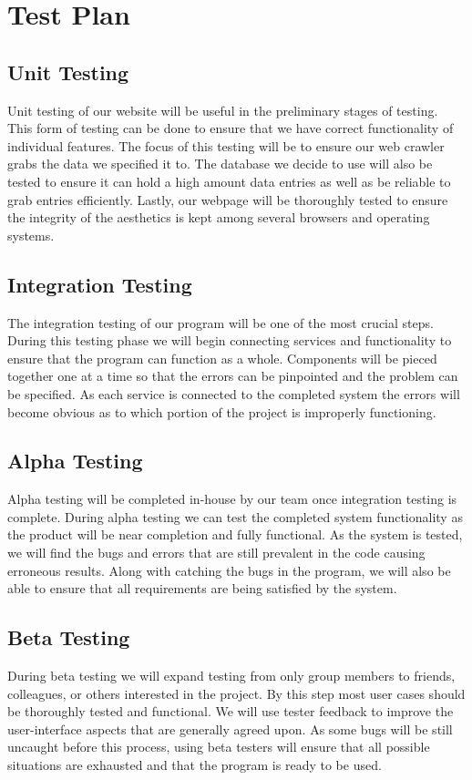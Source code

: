 \chapter{Test Plan}

\section{Unit Testing}
Unit testing of our website will be useful in the preliminary stages of testing. This form of testing can be done to ensure that we have correct functionality of individual features. The focus of this testing will be to ensure our web crawler grabs the data we specified it to. The database we decide to use will also be tested to ensure it can hold a high amount data entries as well as be reliable to grab entries efficiently. Lastly, our webpage will be thoroughly tested to ensure the integrity of the aesthetics is kept among several browsers and operating systems.

\section{Integration Testing}
The integration testing of our program will be one of the most crucial steps. During this testing phase we will begin connecting services and functionality to ensure that the program can function as a whole. Components will be pieced together one at a time so that the errors can be pinpointed and the problem can be specified. As each service is connected to the completed system the errors will become obvious as to which portion of the project is improperly functioning.  

\section{Alpha Testing}
Alpha testing will be completed in-house by our team once integration testing is complete. During alpha testing we can test the completed system functionality as the product will be near completion and fully functional. As the system is tested, we will find the bugs and errors that are still prevalent in the code causing erroneous results. Along with catching the bugs in the program, we will also be able to ensure that all requirements are being satisfied by the system. 

\section{Beta Testing}
During beta testing we will expand testing from only group members to friends, colleagues, or others interested in the project. By this step most user cases should be thoroughly tested and functional. We will use tester feedback to improve the user-interface aspects that are generally agreed upon. As some bugs will be still uncaught before this process, using beta testers will ensure that all possible situations are exhausted and that the program is ready to be used.
